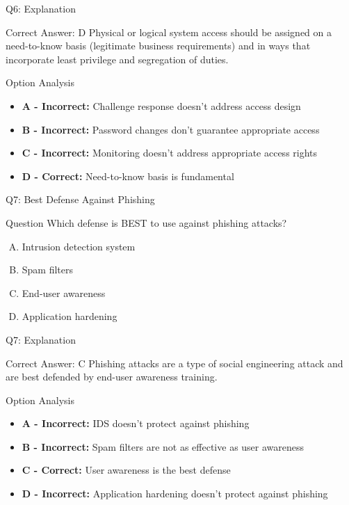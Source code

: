 \documentclass{beamer}
\begin{document}
	\begin{frame}{Q6: Explanation}
		\begin{block}{Correct Answer: D}
			Physical or logical system access should be assigned on a need-to-know basis (legitimate business requirements) and in ways that incorporate least privilege and segregation of duties.
		\end{block}
		\begin{block}{Option Analysis}
			\begin{itemize}
				\item \textbf{A - Incorrect:} Challenge response doesn't address access design
				\item \textbf{B - Incorrect:} Password changes don't guarantee appropriate access
				\item \textbf{C - Incorrect:} Monitoring doesn't address appropriate access rights
				\item \textbf{D - Correct:} Need-to-know basis is fundamental
			\end{itemize}
		\end{block}
	\end{frame}
	
	\begin{frame}{Q7: Best Defense Against Phishing}
		\begin{block}{Question}
			Which defense is BEST to use against phishing attacks?
		\end{block}
		\begin{enumerate}[(A)]
			\item Intrusion detection system
			\item Spam filters
			\item End-user awareness
			\item Application hardening
		\end{enumerate}
	\end{frame}
	
	\begin{frame}{Q7: Explanation}
		\begin{block}{Correct Answer: C}
			Phishing attacks are a type of social engineering attack and are best defended by end-user awareness training.
		\end{block}
		\begin{block}{Option Analysis}
			\begin{itemize}
				\item \textbf{A - Incorrect:} IDS doesn't protect against phishing
				\item \textbf{B - Incorrect:} Spam filters are not as effective as user awareness
				\item \textbf{C - Correct:} User awareness is the best defense
				\item \textbf{D - Incorrect:} Application hardening doesn't protect against phishing
			\end{itemize}
		\end{block}
	\end{frame}
	
\end{document}

